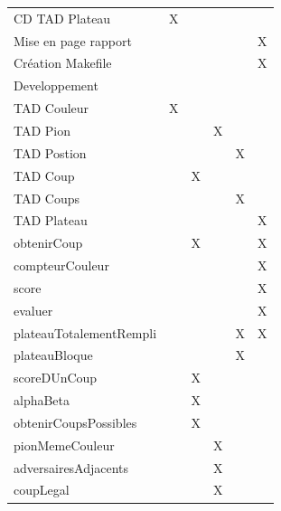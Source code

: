 \documentclass{article}
\begin{document}
\begin{tabular}{|l|c|c|c|c|c|}
  CD TAD Plateau & X & & & & \\                              
  Mise en page rapport & & & & & X \\      
  Création Makefile & & & & & X \\
  \hline
  Developpement \\
  \hline
  TAD Couleur & X & & & & \\                                                                                                                                                                       
  TAD Pion & & & X & & \\                                                                                                                                                                              
  TAD Postion & & & & X &  \\                                                                                                                                                                          
  TAD Coup & & X & &  & \\                                                                                                                                                                              
  TAD Coups & & & & X & \\                                                                                                                                                                             
  TAD Plateau & & & & & X \\                                                                                                                                                                      
  obtenirCoup & & X & & & X \\
  compteurCouleur & & & & & X \\
  score & & & & & X \\
  evaluer & & & & & X \\
  plateauTotalementRempli & & & & X & X \\
  plateauBloque & & & & X & \\
  scoreDUnCoup & & X & & & \\
  alphaBeta & & X & & & \\
  obtenirCoupsPossibles & & X & & & \\
  pionMemeCouleur & & & X & & \\
  adversairesAdjacents & & & X & & \\
  coupLegal & & & X & & \\

\end{tabular}
\end{document}
